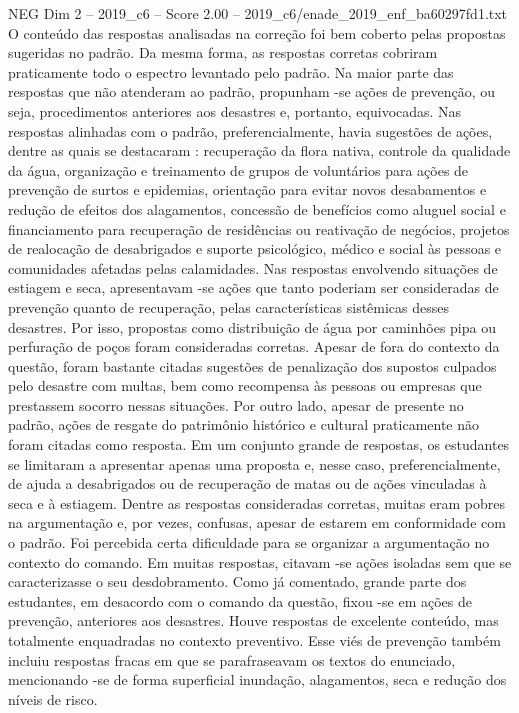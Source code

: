 \begin{textsample}{NEG Dim 2 – 2019\_c6 – Score 2.00 – 2019\_c6/enade\_2019\_enf\_ba60297fd1.txt}
O conteúdo das respostas analisadas na correção foi bem coberto pelas propostas sugeridas no padrão.
Da mesma forma, as respostas corretas cobriram praticamente todo o espectro levantado pelo padrão.
Na maior parte das respostas que não atenderam ao padrão, propunham -se ações de prevenção, ou seja, procedimentos anteriores aos desastres e, portanto, equivocadas.
Nas respostas alinhadas com o padrão, preferencialmente, havia sugestões de ações, dentre as quais se destacaram : recuperação da flora nativa, controle da qualidade da água, organização e treinamento de grupos de voluntários para ações de prevenção de surtos e epidemias, orientação para evitar novos desabamentos e redução de efeitos dos alagamentos, concessão de benefícios como aluguel social e financiamento para recuperação de residências ou reativação de negócios, projetos de realocação de desabrigados e suporte psicológico, médico e social às pessoas e comunidades afetadas pelas calamidades.
Nas respostas envolvendo situações de estiagem e seca, apresentavam -se ações que tanto poderiam ser consideradas de prevenção quanto de recuperação, pelas características sistêmicas desses desastres.
Por isso, propostas como distribuição de água por caminhões pipa ou perfuração de poços foram consideradas corretas.
Apesar de fora do contexto da questão, foram bastante citadas sugestões de penalização dos supostos culpados pelo desastre com multas, bem como recompensa às pessoas ou empresas que prestassem socorro nessas situações.
Por outro lado, apesar de presente no padrão, ações de resgate do patrimônio histórico e cultural praticamente não foram citadas como resposta.
Em um conjunto grande de respostas, os estudantes se limitaram a apresentar apenas uma proposta e, nesse caso, preferencialmente, de ajuda a desabrigados ou de recuperação de matas ou de ações vinculadas à seca e à estiagem.
Dentre as respostas consideradas corretas, muitas eram pobres na argumentação e, por vezes, confusas, apesar de estarem em conformidade com o padrão.
Foi percebida certa dificuldade para se organizar a argumentação no contexto do comando.
Em muitas respostas, citavam -se ações isoladas sem que se caracterizasse o seu desdobramento.
Como já comentado, grande parte dos estudantes, em desacordo com o comando da questão, fixou -se em ações de prevenção, anteriores aos desastres.
Houve respostas de excelente conteúdo, mas totalmente enquadradas no contexto preventivo.
Esse viés de prevenção também incluiu respostas fracas em que se parafraseavam os textos do enunciado, mencionando -se de forma superficial inundação, alagamentos, seca e redução dos níveis de risco.

\end{textsample}
